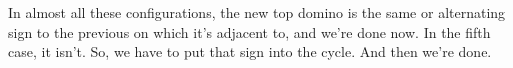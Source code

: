 \documentclass[12pt]{article}
\numberwithin{equation}{section}
\newcommand{\horizontalDominoRSShift}[4]{\filldraw [dominoRSStyle] (#2 - 1 + #4 + \eps, #1 - 1 + \eps) rectangle + (2 - \teps, 1 -\teps) node [dominoText] {$#3$};}
\newcommand{\verticalDominoRSShift}[4]{\filldraw [dominoRSStyle] (#2 - 1 + #4 + \eps,  #1 - 1 + \eps) rectangle + (1 - \teps,2 -\teps) node [dominoText] {$#3$};}
\begin{document}
  \begin{figure}[H]
    \centering
  \end{figure}

  In almost all these configurations, the new top domino is the same or alternating sign to the previous on which it's adjacent to, and we're done now.
  In the fifth case, it isn't.
  So, we have to put that sign into the cycle.
  And then we're done.
\end{document}
